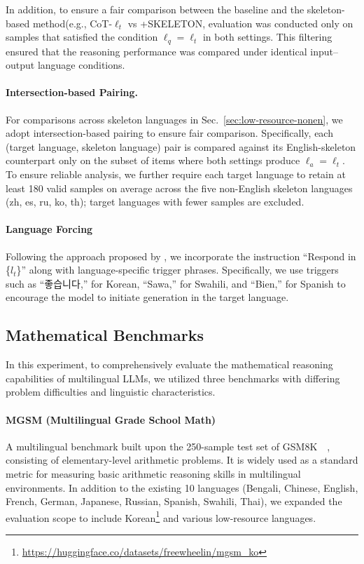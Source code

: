 In addition, to ensure a fair comparison between the baseline and the skeleton-based method(e.g., CoT-$\ell_t$ vs \textsc{+SKELETON}, evaluation was conducted only on samples that satisfied the condition $\ell_q = \ell_t$ in both settings. This filtering ensured that the reasoning performance was compared under identical input–output language conditions.

\paragraph{Intersection-based Pairing.}
For comparisons across skeleton languages in Sec.~\ref{sec:low-resource-nonen}, we adopt intersection-based pairing to ensure fair comparison. Specifically, each (target language, skeleton language) pair is compared against its English-skeleton counterpart only on the subset of items where both settings produce $\ell_a=\ell_t$. To ensure reliable analysis, we further require each target language to retain at least 180 valid samples on average across the five non-English skeleton languages (zh, es, ru, ko, th); target languages with fewer samples are excluded.

\paragraph{Language Forcing}
Following the approach proposed by \citet{reason-lang-emnlp2025}, we incorporate the instruction ``Respond in \{$l_t$\}'' along with language-specific trigger phrases. Specifically, we use triggers such as ``좋습니다,'' for Korean, ``Sawa,'' for Swahili, and ``Bien,'' for Spanish to encourage the model to initiate generation in the target language.

\subsection{Mathematical Benchmarks}
In this experiment, to comprehensively evaluate the mathematical reasoning capabilities of multilingual LLMs, we utilized three benchmarks with differing problem difficulties and linguistic characteristics.

\paragraph{MGSM (Multilingual Grade School Math)}
A multilingual benchmark built upon the 250-sample test set of GSM8K~\citep{cobbe2021training}~\citep{shi2022language}, consisting of elementary-level arithmetic problems. It is widely used as a standard metric for measuring basic arithmetic reasoning skills in multilingual environments. In addition to the existing 10 languages (Bengali, Chinese, English, French, German, Japanese, Russian, Spanish, Swahili, Thai), we expanded the evaluation scope to include Korean\footnote{\url{https://huggingface.co/datasets/freewheelin/mgsm_ko}} and various low-resource languages.

